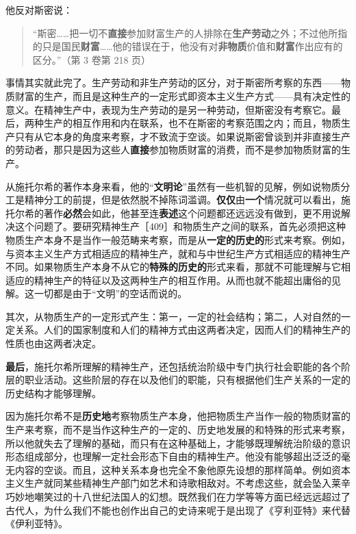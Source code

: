 他反对斯密说：

\begin{quote}“斯密……把一切不\textbf{直接}参加财富生产的人排除在\textbf{生产劳动}之外；不过他所指的只是国民\textbf{财富}……他的错误在于，他没有对\textbf{非物质}价值和\textbf{财富}作出应有的区分。”（第 3 卷第 218 页）\end{quote}

事情其实就此完了。生产劳动和非生产劳动的区分，对于斯密所考察的东西——物质财富的生产，而且是这种生产的一定形式即资本主义生产方式——具有决定性的意义。在精神生产中，表现为生产劳动的是另一种劳动，但斯密没有考察它。最后，两种生产的相互作用和内在联系，也不在斯密的考察范围之内；而且，物质生产只有从它本身的角度来考察，才不致流于空谈。如果说斯密曾谈到并非直接生产的劳动者，那只是因为这些人\textbf{直接}参加物质财富的消费，而不是参加物质财富的生产。

从施托尔希的著作本身来看，他的“\textbf{文明论}”虽然有一些机智的见解，例如说物质分工是精神分工的前提，但是依然脱不掉陈词滥调。\textbf{仅仅}由\textbf{一个}情况就可以看出，施托尔希的著作\textbf{必然}会如此，他甚至连\textbf{表述}这个问题都还远远没有做到，更不用说解决这个问题了。要研究精神生产［409］和物质生产之间的联系，首先必须把这种物质生产本身不是当作一般范畴来考察，而是从\textbf{一定的历史的}形式来考察。例如，与资本主义生产方式相适应的精神生产，就和与中世纪生产方式相适应的精神生产不同。如果物质生产本身不从它的\textbf{特殊的历史的}形式来看，那就不可能理解与它相适应的精神生产的特征以及这两种生产的相互作用。从而也就不能超出庸俗的见解。这一切都是由于“文明”的空话而说的。

其次，从物质生产的一定形式产生：第一，一定的社会结构；第二，人对自然的一定关系。人们的国家制度和人们的精神方式由这两者决定，因而人们的精神生产的性质也由这两者决定。

\textbf{最后}，施托尔希所理解的精神生产，还包括统治阶级中专门执行社会职能的各个阶层的职业活动。这些阶层的存在以及他们的职能，只有根据他们生产关系的一定的历史结构才能够理解。

因为施托尔希不是\textbf{历史地}考察物质生产本身，他把物质生产当作一般的物质财富的生产来考察，而不是当作这种生产的一定的、历史地发展的和特殊的形式来考察，所以他就失去了理解的基础，而只有在这种基础上，才能够既理解统治阶级的意识形态组成部分，也理解一定社会形态下自由的精神生产。他没有能够超出泛泛的毫无内容的空谈。而且，这种关系本身也完全不象他原先设想的那样简单。例如资本主义生产就同某些精神生产部门如艺术和诗歌相敌对。不考虑这些，就会坠入莱辛巧妙地嘲笑过的十八世纪法国人的幻想。既然我们在力学等等方面已经远远超过了古代人，为什么我们不能也创作出自己的史诗来呢于是出现了《亨利亚特》来代替《伊利亚特》。

